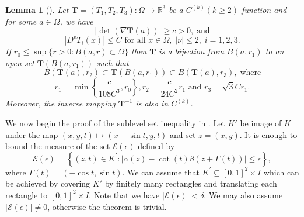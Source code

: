 \documentclass[a4paper,reqno]{amsart}
\newtheorem{lemma}[theorem]{Lemma}
\theoremstyle{definition}
\theoremstyle{remark}
\numberwithin{equation}{section}
\newcommand{\R}{{\mathbb {R}}}
\begin{document}
	\begin{lemma}[\cite{CG}]\label{InverseFunctionTheorem}
		Let $\boldsymbol{T}=(T_1,T_2,T_3):\Omega\to\R^3$ be a $C^{(k)}(k \geqslant 2)$ function and for some $a \in \Omega$, we have
		\[|\operatorname{det}(\nabla \boldsymbol{T}(a))| \geqslant c>0,\;\text{and}\]
		\[\left|D^v T_i(x)\right| \leq C \text { for all } x \in \Omega,\;|\nu| \leqslant 2, \;i=1,2,3.\]
		If $r_0 \leq \sup \{r>0: B(a, r) \subset \Omega\}$ then $\boldsymbol{T}$ is a bijection from $B\left(a, r_1\right)$ to an open set $\boldsymbol{T}\left(B\left(a, r_1\right)\right)$ such that
		\[B\left(\boldsymbol{T}(a), r_2\right) \subset \boldsymbol{T}\left(B\left(a, r_1\right)\right) \subset B\left(\boldsymbol{T}(a), r_3\right),\;\text{where}\]
		\[r_1=\min \left\{\frac{c}{108C^3}, r_0\right\}, r_2=\frac{c}{24C^{2}} r_1 \text { and } r_3=\sqrt{3} C r_1.\]
		Moreover, the inverse mapping $\boldsymbol{T}^{-1}$ is also in $C^{(k)}$.
	\end{lemma}
	We now begin the proof of the sublevel set inequality in . Let $K'$ be image of $K$ under the map $(x,y,t)\mapsto (x-\sin t,y,t)$ and set ${z}=(x,y)$. It is enough to bound the measure of the set $\mathcal{E}(\epsilon)$ defined by
	\[\mathcal{E}(\epsilon)=\left\{({z}, t) \in K^{\prime}:|\alpha({z})-\cot(t) \beta({z}+\Gamma(t))| \leq \epsilon\right\},\]
	where $\Gamma(t)=\left(-\cos t, \sin t\right)$. We can assume that $K^{\prime} \subseteq[0,1]^{2} \times I$ which can be achieved by covering $K'$ by finitely many rectangles and translating each rectangle to $[0,1]^{2} \times I$. Note that we have $|\mathcal{E}(\epsilon)|<\delta$. We may also assume $|\mathcal{E}(\epsilon)|\neq0$, otherwise the theorem is trivial.
	
\end{document}
